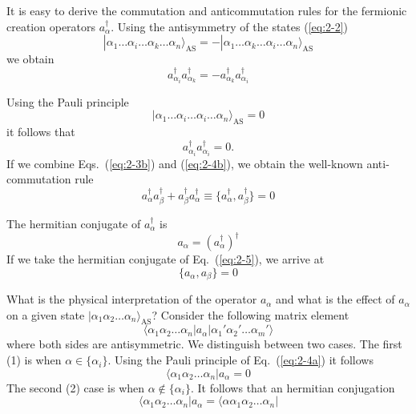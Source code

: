 \documentclass[graybox,sectrefs,envcountresetchap,open=right]{svmonodo}
\begin{document}
It is easy to derive the commutation and anticommutation rules  for the fermionic creation operators 
$a_\alpha^{\dagger}$. Using the antisymmetry of the states 
(\ref{eq:2-2})
\begin{equation}
	|\alpha_1\dots \alpha_i\dots \alpha_k\dots \alpha_n\rangle_{\mathrm{AS}} = 
		- |\alpha_1\dots \alpha_k\dots \alpha_i\dots \alpha_n\rangle_{\mathrm{AS}} \label{eq:2-3a}
\end{equation}
we obtain
\begin{equation}
	 a_{\alpha_i}^{\dagger}  a_{\alpha_k}^{\dagger} = - a_{\alpha_k}^{\dagger} a_{\alpha_i}^{\dagger} \label{eq:2-3b}
\end{equation}


Using the Pauli principle
\begin{equation}
	|\alpha_1\dots \alpha_i\dots \alpha_i\dots \alpha_n\rangle_{\mathrm{AS}} = 0 \label{eq:2-4a}
\end{equation}
it follows that
\begin{equation}
	a_{\alpha_i}^{\dagger}  a_{\alpha_i}^{\dagger} = 0. \label{eq:2-4b}
\end{equation}
If we combine Eqs.~(\ref{eq:2-3b}) and (\ref{eq:2-4b}), we obtain the well-known anti-commutation rule
\begin{equation}
	a_{\alpha}^{\dagger}  a_{\beta}^{\dagger} + a_{\beta}^{\dagger}  a_{\alpha}^{\dagger} \equiv 
		\{a_{\alpha}^{\dagger},a_{\beta}^{\dagger}\} = 0 \label{eq:2-5}
\end{equation}



The hermitian conjugate  of $a_\alpha^{\dagger}$ is
\begin{equation}
	a_{\alpha} = ( a_{\alpha}^{\dagger} )^{\dagger} \label{eq:2-6}
\end{equation}
If we take the hermitian conjugate of Eq.~(\ref{eq:2-5}), we arrive at 
\begin{equation}
	\{a_{\alpha},a_{\beta}\} = 0 \label{eq:2-7}
\end{equation}




What is the physical interpretation of the operator $a_\alpha$ and what is the effect of 
$a_\alpha$ on a given state $|\alpha_1\alpha_2\dots\alpha_n\rangle_{\mathrm{AS}}$? 
Consider the following matrix element
\begin{equation}
	\langle\alpha_1\alpha_2 \dots \alpha_n|a_\alpha|\alpha_1'\alpha_2' \dots \alpha_m'\rangle \label{eq:2-8}
\end{equation}
where both sides are antisymmetric. We  distinguish between two cases. The first (1) is when
$\alpha \in \{\alpha_i\}$. Using the Pauli principle of Eq.~(\ref{eq:2-4a}) it follows
\begin{equation}
		\langle\alpha_1\alpha_2 \dots \alpha_n|a_\alpha = 0 \label{eq:2-9a}
\end{equation}
The second (2) case is when $\alpha \notin \{\alpha_i\}$. It follows that an hermitian conjugation
\begin{equation}
		\langle \alpha_1\alpha_2 \dots \alpha_n|a_\alpha = \langle\alpha\alpha_1\alpha_2 \dots \alpha_n|  \label{eq:2-9b}
\end{equation}
\end{document}
